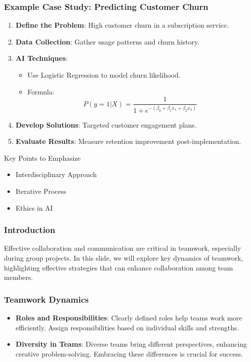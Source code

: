 \documentclass[aspectratio=169]{beamer}
\begin{document}
\begin{frame}[fragile]
    \frametitle{Example Case Study: Predicting Customer Churn}
    \begin{enumerate}
        \item \textbf{Define the Problem}: High customer churn in a subscription service.
        \item \textbf{Data Collection}: Gather usage patterns and churn history.
        \item \textbf{AI Techniques}:
        \begin{itemize}
            \item Use Logistic Regression to model churn likelihood.
            \item Formula:
            \begin{equation}
                P(y=1|X) = \frac{1}{1 + e^{-(\beta_0 + \beta_1 x_1 + \beta_2 x_2)}}
            \end{equation}
        \end{itemize}
        \item \textbf{Develop Solutions}: Targeted customer engagement plans.
        \item \textbf{Evaluate Results}: Measure retention improvement post-implementation.
    \end{enumerate}
    
    \begin{block}{Key Points to Emphasize}
        \begin{itemize}
            \item Interdisciplinary Approach
            \item Iterative Process
            \item Ethics in AI
        \end{itemize}
    \end{block}
\end{frame}

\begin{frame}[fragile]
    \frametitle{Introduction}
    Effective collaboration and communication are critical in teamwork, especially during group projects. In this slide, we will explore key dynamics of teamwork, highlighting effective strategies that can enhance collaboration among team members.
\end{frame}

\begin{frame}[fragile]
    \frametitle{Teamwork Dynamics}
    \begin{itemize}
        \item \textbf{Roles and Responsibilities}: Clearly defined roles help teams work more efficiently. Assign responsibilities based on individual skills and strengths.
        
        \item \textbf{Diversity in Teams}: Diverse teams bring different perspectives, enhancing creative problem-solving. Embracing these differences is crucial for success.
    \end{itemize}
\end{frame}
\end{document}
